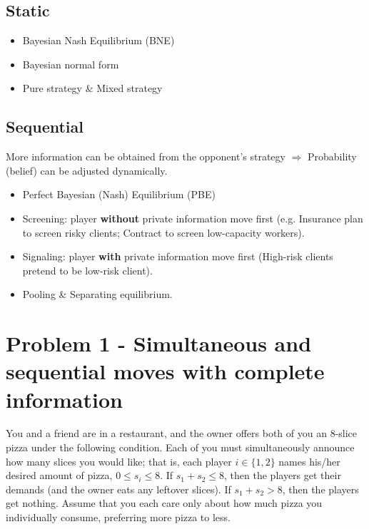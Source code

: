 \documentclass{article}
\begin{document}
\begin{mdframed}[backgroundcolor=blue!20,linecolor=white]
\subsection*{\hspace{4mm} Static}
\begin{itemize}
\item Bayesian Nash Equilibrium (BNE)
\item Bayesian normal form
\item Pure strategy \& Mixed strategy

\end{itemize}

\subsection*{\hspace{4mm} Sequential}
More information can be obtained from the opponent's strategy
$\Rightarrow$ Probability (belief) can be adjusted dynamically.
\begin{itemize}
\item Perfect Bayesian (Nash) Equilibrium (PBE)
\item Screening: player \textbf{without} private information move first (e.g. Insurance plan to screen risky clients; Contract to screen low-capacity workers).
\item Signaling: player \textbf{with} private information move first (High-risk clients pretend to be low-risk client).
\item Pooling \& Separating equilibrium.
\end{itemize}



\end{mdframed}


\section{Problem 1 - Simultaneous and sequential moves with complete information}


You and a friend are in a restaurant, and the owner offers both of you an 8-slice pizza under
the following condition. Each of you must simultaneously announce how many slices you would
like; that is, each player $i \in \{1, 2\}$ names his/her desired amount of pizza, $0 \leq s_i
\leq 8$. If $s_1 + s_2 \leq 8$, then the players get their demands (and the owner eats any
leftover slices). If $s_1 + s_2 > 8$, then the players get nothing. Assume that you each care
only about how much pizza you individually consume, preferring more pizza to less.
\end{document}
